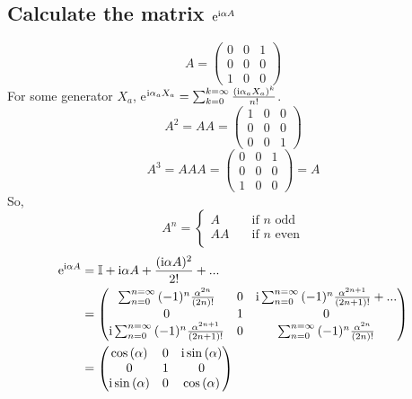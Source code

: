\documentclass[main.tex]{subfiles}
\begin{document}
\subsection{Calculate the matrix $\operatorname{e}^{\mathrm{i}\alpha A}$}
\begin{equation}
A=\begin{pmatrix} 0 & 0 & 1  \\ 0 & 0 & 0 \\ 1 & 0 & 0  \end{pmatrix}
\end{equation}
For some generator $X_a$, e$^{\mathrm{i}\alpha_aX_a}=\sum_{k=0}^{k=\infty}{\frac{(\mathrm{i}\alpha_aX_a)^k}{n!}}$.
\begin{equation}
A^2=AA=\begin{pmatrix} 1 & 0 & 0  \\ 0 & 0 & 0 \\ 0 & 0 & 1  \end{pmatrix}
\end{equation}
\begin{equation}
A^3=AAA=\begin{pmatrix}  0 & 0 & 1  \\ 0 & 0 & 0 \\ 1 & 0 & 0  \end{pmatrix}=A
\end{equation}
So,
\begin{equation}
A^n = \begin{cases} A & \quad \text{if } n \text{ odd}\\ AA & \quad \text{if } n \text{ even}\\ \end{cases}
\end{equation}
\begin{align}
\operatorname{e}^{\mathrm{i}\alpha A}&=\mathbb{I} + \mathrm{i}\alpha A +\frac{(\mathrm{i}\alpha A)^2}{2!} + ...\\
&=\begin{pmatrix}  \sum_{n=0}^{n=\infty}{(-1)^n\frac{\alpha^{2n}}{(2n)!}}  & 0 & \mathrm{i}\sum_{n=0}^{n=\infty}{(-1)^n\frac{\alpha^{2n+1}}{(2n+1)!}}+...  \\ 0 & 1 & 0 \\ \mathrm{i}\sum_{n=0}^{n=\infty}{(-1)^n\frac{\alpha^{2n+1}}{(2n+1)!}} & 0 & \sum_{n=0}^{n=\infty}{(-1)^n\frac{\alpha^{2n}}{(2n)!}}  \end{pmatrix}\\
&=\begin{pmatrix}  \cos{(\alpha)} & 0 & \mathrm{i}\sin{(\alpha)}  \\ 0 & 1 & 0 \\ \mathrm{i}\sin{(\alpha)} & 0 & \cos{(\alpha)}  \end{pmatrix}
\end{align}
%
\end{document}
